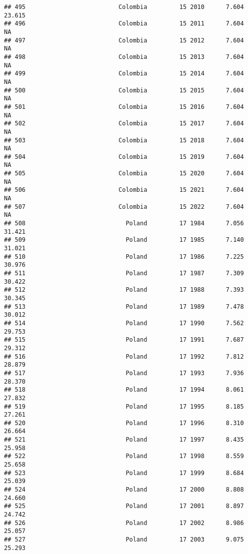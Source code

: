 \documentclass[
]{article}
\begin{document}
\begin{verbatim}
## 495                          Colombia         15 2010      7.604     23.615
## 496                          Colombia         15 2011      7.604         NA
## 497                          Colombia         15 2012      7.604         NA
## 498                          Colombia         15 2013      7.604         NA
## 499                          Colombia         15 2014      7.604         NA
## 500                          Colombia         15 2015      7.604         NA
## 501                          Colombia         15 2016      7.604         NA
## 502                          Colombia         15 2017      7.604         NA
## 503                          Colombia         15 2018      7.604         NA
## 504                          Colombia         15 2019      7.604         NA
## 505                          Colombia         15 2020      7.604         NA
## 506                          Colombia         15 2021      7.604         NA
## 507                          Colombia         15 2022      7.604         NA
## 508                            Poland         17 1984      7.056     31.421
## 509                            Poland         17 1985      7.140     31.021
## 510                            Poland         17 1986      7.225     30.976
## 511                            Poland         17 1987      7.309     30.422
## 512                            Poland         17 1988      7.393     30.345
## 513                            Poland         17 1989      7.478     30.012
## 514                            Poland         17 1990      7.562     29.753
## 515                            Poland         17 1991      7.687     29.312
## 516                            Poland         17 1992      7.812     28.879
## 517                            Poland         17 1993      7.936     28.370
## 518                            Poland         17 1994      8.061     27.832
## 519                            Poland         17 1995      8.185     27.261
## 520                            Poland         17 1996      8.310     26.664
## 521                            Poland         17 1997      8.435     25.958
## 522                            Poland         17 1998      8.559     25.658
## 523                            Poland         17 1999      8.684     25.039
## 524                            Poland         17 2000      8.808     24.660
## 525                            Poland         17 2001      8.897     24.742
## 526                            Poland         17 2002      8.986     25.057
## 527                            Poland         17 2003      9.075     25.293

\end{verbatim}
\end{document}
